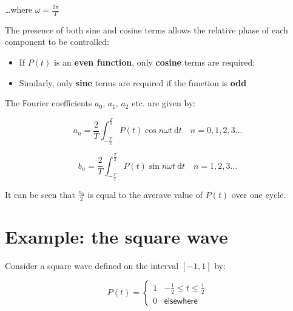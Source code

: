 \documentclass[
]{book}
\providecommand{\tightlist}{%
  \setlength{\itemsep}{0pt}\setlength{\parskip}{0pt}}
\begin{document}
\ldots where \(\omega = \frac{2\pi}{T}\)

The presence of both sine and cosine terms allows the relative phase of each component to be controlled:

\begin{itemize}
\tightlist
\item
  If \(P(t)\) is an \textbf{even function}, only \textbf{cosine} terms are required;
\item
  Similarly, only \textbf{sine} terms are required if the function is \textbf{odd}
\end{itemize}

The Fourier coefficients \(a_0\), \(a_1\), \(a_2\) etc. are given by:

\begin{equation}
a_n = \frac{2}{T} \int_{-\frac{T}{2}}^{\frac{T}{2}} P(t) \cos n \omega t ~\mathrm{d}t \quad n = 0,1,2,3 \dots
\end{equation}

\begin{equation}
b_n = \frac{2}{T} \int_{-\frac{T}{2}}^{\frac{T}{2}} P(t) \sin n \omega t ~\mathrm{d}t \quad n = 1,2,3 \dots
\end{equation}

It can be seen that \(\frac{a_0}{2}\) is equal to the averave value of \(P(t)\) over one cycle.

\hypertarget{sec:ch11-squarewave}{%
\section{Example: the square wave}\label{sec:ch11-squarewave}}

Consider a square wave defined on the interval \(\left[-1,1 \right]\) by:

\begin{equation}
P(t) = \left\{ \begin{array}{rl} 1 & -\frac{1}{2} \leq t \leq \frac{1}{2} \\ 0 & \textsf{elsewhere} \end{array} \right.
\end{equation}
\end{document}
